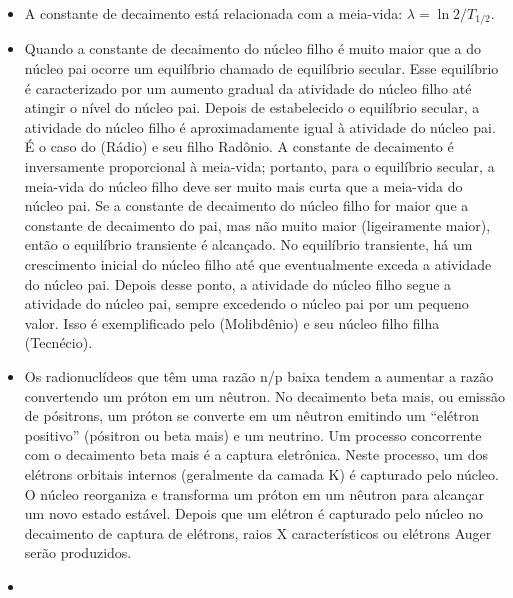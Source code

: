 \documentclass[11pt,a4paper]{article}
\newcounter{exemplo}
\begin{document}
\begin{exemplo}
\begin{itemize}
       \item A constante de decaimento está relacionada com a meia-vida: $\lambda = \ln 2 / T_{1/2}$.
       
       \item Quando a constante de decaimento do núcleo filho é muito maior que a do núcleo pai ocorre um equilíbrio chamado de equilíbrio secular. Esse equilíbrio é caracterizado por um aumento gradual da atividade do núcleo filho até atingir o nível do núcleo pai. Depois de estabelecido o equilíbrio secular, a atividade do núcleo filho é aproximadamente igual à atividade do núcleo pai. É o caso do  (Rádio) e seu filho  {Radônio}. A constante de decaimento é inversamente proporcional à meia-vida; portanto, para o equilíbrio secular, a meia-vida do núcleo filho deve ser muito mais curta que a meia-vida do núcleo pai. Se a constante de decaimento do núcleo filho for maior que a constante de decaimento do pai, mas não muito maior (ligeiramente maior), então o equilíbrio transiente é alcançado. No equilíbrio transiente, há um crescimento inicial do núcleo filho até que eventualmente exceda a atividade do núcleo pai. Depois desse ponto, a atividade do núcleo filho segue a atividade do núcleo pai, sempre excedendo o núcleo pai por um pequeno valor. Isso é exemplificado pelo  (Molibdênio) e seu núcleo filho filha  (Tecnécio). 
       
       \item Os radionuclídeos que têm uma razão n/p baixa tendem a aumentar a razão convertendo um próton em um nêutron. No decaimento beta mais, ou emissão de pósitrons, um próton se converte em um nêutron emitindo um ``elétron positivo'' (pósitron ou beta mais) e um neutrino. Um processo concorrente com o decaimento beta mais é a captura eletrônica. Neste processo, um dos elétrons orbitais internos (geralmente da camada K) é capturado pelo núcleo. O núcleo reorganiza e transforma um próton em um nêutron para alcançar um novo estado estável. Depois que um elétron é capturado pelo núcleo no decaimento de captura de elétrons, raios X característicos ou elétrons Auger serão produzidos.
    \end{itemize}
\end{exemplo}


\begin{exemplo}
    \begin{itemize}
        \item  
    \end{itemize}
\end{exemplo}
\end{document}
